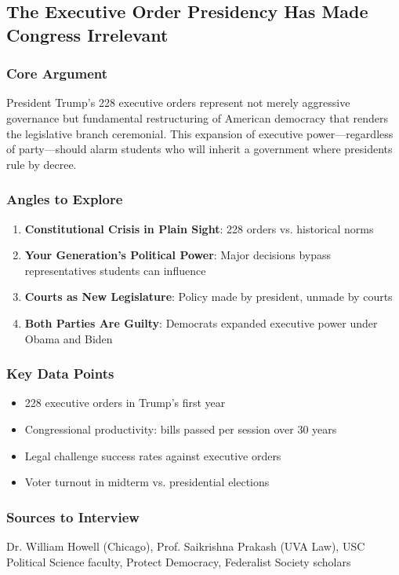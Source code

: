 \documentclass[11pt,letterpaper]{article}
\begin{document}
\subsection{The Executive Order Presidency Has Made Congress Irrelevant}

\subsubsection*{Core Argument}
President Trump's 228 executive orders represent not merely aggressive governance but fundamental restructuring of American democracy that renders the legislative branch ceremonial. This expansion of executive power---regardless of party---should alarm students who will inherit a government where presidents rule by decree.

\subsubsection*{Angles to Explore}
\begin{enumerate}[noitemsep]
    \item \textbf{Constitutional Crisis in Plain Sight}: 228 orders vs. historical norms
    \item \textbf{Your Generation's Political Power}: Major decisions bypass representatives students can influence
    \item \textbf{Courts as New Legislature}: Policy made by president, unmade by courts
    \item \textbf{Both Parties Are Guilty}: Democrats expanded executive power under Obama and Biden
\end{enumerate}

\subsubsection*{Key Data Points}
\begin{itemize}[noitemsep]
    \item 228 executive orders in Trump's first year
    \item Congressional productivity: bills passed per session over 30 years
    \item Legal challenge success rates against executive orders
    \item Voter turnout in midterm vs. presidential elections
\end{itemize}

\subsubsection*{Sources to Interview}
Dr. William Howell (Chicago), Prof. Saikrishna Prakash (UVA Law), USC Political Science faculty, Protect Democracy, Federalist Society scholars
\end{document}
